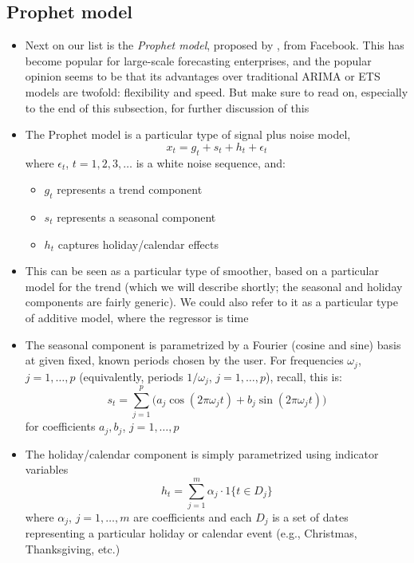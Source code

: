 \documentclass{article}
\begin{document}
\subsection{Prophet model}

\begin{itemize}
\item Next on our list is the \emph{Prophet model}, proposed by
  \citet{taylor2018forecasting}, from Facebook. This has become popular for
  large-scale forecasting enterprises, and the popular opinion seems to be that
  its advantages over traditional ARIMA or ETS models are twofold: flexibility
  and speed. But make sure to read on, especially to the end of this subsection,
  for further discussion of this 

\item The Prophet model is a particular type of signal plus noise model, 
  \[
  x_t = g_t + s_t + h_t + \epsilon_t
  \]
  where $\epsilon_t$, $t = 1,2,3,\dots$ is a white noise sequence, and:
  \begin{itemize}
  \item $g_t$ represents a trend component
  \item $s_t$ represents a seasonal component
  \item $h_t$ captures holiday/calendar effects 
  \end{itemize}

\item This can be seen as a particular type of smoother, based on a particular
  model for the trend (which we will describe shortly; the seasonal and holiday
  components are fairly generic). We could also refer to it as a particular type
  of additive model, where the regressor is time

\item The seasonal component is parametrized by a Fourier (cosine and sine)
  basis at given fixed, known periods chosen by the user. For frequencies
  $\omega_j$, $j = 1,\dots,p$ (equivalently, periods $1/\omega_j$, $j =
  1,\dots,p$), recall, this is:  
  \[
  s_t = \sum_{j=1}^p \Big( a_j \cos(2\pi \omega_j t) + b_j \sin(2\pi \omega_j t)
  \Big) 
  \]
  for coefficients $a_j, b_j$, $j = 1,\dots,p$

\item The holiday/calendar component is simply parametrized using indicator
  variables 
  \[
  h_t = \sum_{j=1}^m \alpha_j \cdot 1\{ t \in D_j \}
  \]
  where $\alpha_j$, $j = 1,\dots,m$ are coefficients and each $D_j$ is a set of
  dates representing a particular holiday or calendar event (e.g., Christmas,
  Thanksgiving, etc.) 


\end{itemize}
\end{document}
